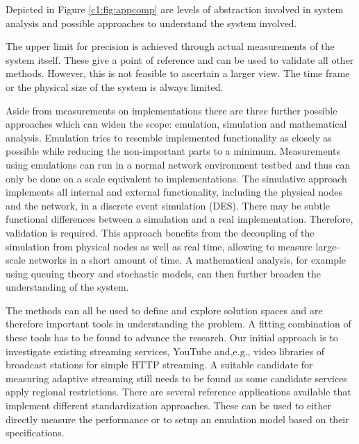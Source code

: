Depicted in Figure \ref{c1:fig:appcomp} are levels of abstraction involved in system analysis and possible approaches to understand the system involved.

The upper limit for precision is achieved through actual measurements of the system itself. These give a point of reference and can be used to validate all other methods. However, this is not feasible to ascertain a larger view. The time frame or the physical size of the system is always limited.

Aside from measurements on implementations there are three further possible approaches which can widen the scope: emulation, simulation and mathematical analysis. 
Emulation tries to resemble implemented functionality as closely as possible while reducing the non-important parts to a minimum. Measurements using emulations can run in a normal network environment testbed and thus can only be done on a scale equivalent to implementations. The simulative approach implements all internal and external functionality, including the physical nodes and the network, in a discrete event simulation (DES). There may be subtle functional differences between a simulation and a real implementation. Therefore, validation is required. This approach benefits from the decoupling of the simulation from physical nodes as well as real time, allowing to measure large-scale networks in a short amount of time.
A mathematical analysis, for example using queuing theory and stochastic models, can then further broaden the understanding of the system.


The methods can all be used to define and explore solution spaces and are therefore important tools in understanding the problem. A fitting combination of these tools has to be found to advance the research. Our initial approach is to investigate existing streaming services, YouTube \cite{metzger2011delivery,mok2011measuring} and,e.g., video libraries of broadcast stations for simple HTTP streaming. A suitable candidate for measuring adaptive streaming still needs to be found as some candidate services apply regional restrictions. There are several reference applications available that implement different standardization approaches. These can be used to either directly measure the performance or to setup an emulation model based on their specifications.



